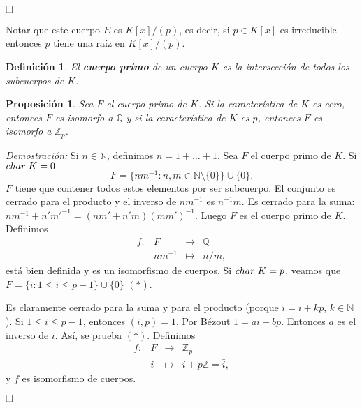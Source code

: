 \documentclass[12pt]{article}
\newtheorem{proposition}[theorem]{Proposición}
\newtheorem{definition}[theorem]{Definición}
\begin{document}
$\hfill \square$

Notar que este cuerpo $E$ es $K[x]/(p)$, es decir, si $p \in K[x]$ es irreducible entonces $p$ tiene una raíz en $K[x]/(p)$.

\begin{definition}El \textbf{cuerpo primo} de un cuerpo $K$ es la intersección de todos los subcuerpos de $K$.
\end{definition}

\begin{proposition}Sea $F$ el cuerpo primo de $K$. Si la característica de $K$ es cero, entonces $F$ es isomorfo a $\mathbb{Q}$ y si la característica de $K$ es $p$, entonces $F$ es isomorfo a $\mathbb{Z}_p$.
\end{proposition}
\emph{Demostración: }Si $n \in \mathbb{N}$, definimos $n = 1+ \ldots + 1$. Sea $F$ el cuerpo primo de $K$. Si $char\hspace{0.1cm} K = 0$ $$F = \lbrace nm^{-1}: n,m \in \mathbb{N} \setminus \lbrace 0 \rbrace \rbrace \cup \lbrace 0 \rbrace.$$ $F$ tiene que contener todos estos elementos por ser subcuerpo. El conjunto es cerrado para el producto y el inverso de $nm^{-1}$ es $n^{-1}m$. Es cerrado para la suma: $nm^{-1}+n'm'^{-1} = (nm'+n'm)(mm')^{-1}.$ Luego $F$ es el cuerpo primo de $K$. Definimos $$\begin{array}{rccl}
f \colon &F&\longrightarrow &\mathbb{Q}\\
&nm^{-1}& \longmapsto &n/m,
\end{array}
$$ está bien definida y es un isomorfismo de cuerpos. Si $char\hspace{0.1cm} K = p$, veamos que $F = \lbrace i: 1 \leq i \leq p-1 \rbrace \cup \lbrace 0 \rbrace$ $(\ast)$.

Es claramente cerrado para la suma y para el producto (porque $i = i+kp$, $k \in \mathbb{N}$). Si $1 \leq i \leq p-1$, entonces $(i,p)=1$. Por Bézout $1 = ai + bp$. Entonces $a$ es el inverso de $i$. Así, se prueba $(\ast)$. Definimos $$\begin{array}{rccl}
f \colon &F&\longrightarrow &\mathbb{Z}_p\\
&i& \longmapsto &i+p\mathbb{Z} = \bar{i},
\end{array}
$$ y $f$ es isomorfismo de cuerpos.

$\hfill \square$
\end{document}
